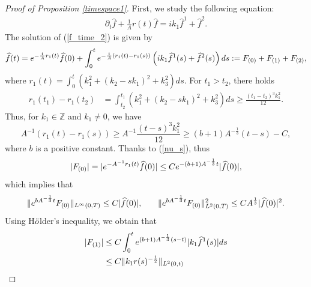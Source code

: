 \documentclass[12pt, reqno]{amsart}
\numberwithin{equation}{section}
\begin{document}
\begin{proof}[Proof of Proposition \ref{timespace1}]
		First, we study the following equation:
		\begin{equation}\label{f_time_2}
			\begin{array}{lr}
				\partial_t\widehat{f}+\frac{1}{A} r(t) \widehat{f}={ik_1}\widehat{f}^1+\widehat{f}^2.
			\end{array}
		\end{equation}	
		The solution of (\ref{f_time_2}) is given by
		\begin{equation*}
			\begin{aligned}
				\widehat{f}(t)={\rm e}^{-\frac{1}{A} r_1(t)}\widehat{f}(0)+\int_0^t {\rm e}^{-\frac{1}{A}(r_1(t)-r_1(s))}\left(ik_1\widehat{f}^1(s)
				+\widehat{f}^2(s)\right)ds:=F_{(0)}+F_{(1)}+F_{(2)},
			\end{aligned}
		\end{equation*}
		where 
		$r_1(t)=\int_0^t\left(k_1^2+\left(k_2-sk_1\right)^2+{k_3^2}\right)ds.$
		For $t_1>t_2$, there holds
		\begin{equation*}
			\begin{aligned}
				{r_1(t_1)-r_1(t_2)}&=\int_{t_2}^{t_1}
				\left(k_1^2+\left(k_2-sk_1\right)^2+k_3^2\right)ds
				\geq \frac{(t_1-t_2)^3k_1^2}{12}.
			\end{aligned}
		\end{equation*}
		Thus, for $k_1\in\mathbb{Z}$ and $k_1\neq 0$, we have
		\begin{equation}\label{nu_s}
			{A}^{-1}\left(r_1(t)-r_1(s)\right)\geq {A}^{-1}\frac{(t-s)^3 k_1^2}{12}
			\geq (b+1)A^{-\frac{1}{3}}(t-s)-C,	
		\end{equation}
		where $b$ is a positive constant.
		Thanks to (\ref{nu_s}), thus   
		$$|F_{(0)}|=|{\rm e}^{-{A}^{-1} r_1(t)}\widehat{f}(0)|\leq C{\rm e}^{-(b+1)A^{-\frac{1}{3}}t}|\widehat{f}(0)|,$$
		which implies that 
		\begin{equation}\label{f0_result}
			\begin{aligned}
				&\|{\rm e}^{bA^{-\frac{1}{3}}t}F_{(0)}\|_{L^{\infty}(0,T)}\leq C|\widehat{f}(0)|,~~~
				&\|{\rm e}^{bA^{-\frac{1}{3}}t}F_{(0)}\|^2_{L^{2}(0,T)}\leq CA^{\frac{1}{3}}|\widehat{f}(0)|^2.
			\end{aligned}
		\end{equation}
		Using H$\rm \ddot{o}$lder's inequality, we obtain that 
		\begin{equation}\label{F1_equ1}
			\begin{aligned}
				|F_{(1)}|&\leq C\int_0^t {\rm e}^{(b+1)A^{-\frac{1}{3}}(s-t)}
				|k_1\widehat{f}^1(s)|ds
				\\&\leq C\|k_1r(s)^{-\frac{1}{2}}\|_{L^2(0,t)}

\end{aligned}
\end{equation}
\end{proof}
\end{document}
